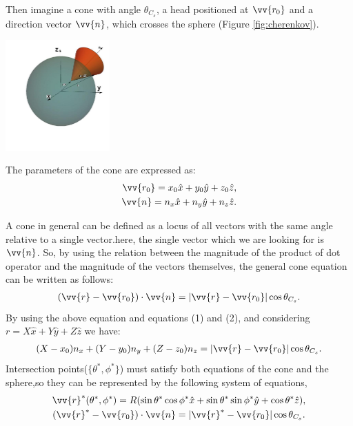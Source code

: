 \documentclass{article}
\begin{document}
\begin{multicols}{2}
Then imagine a cone with angle $\theta_{C_s}$, a head positioned at $\vv{r_0}$ and a direction vector $\vv{n}$, which crosses the sphere (Figure \ref{fig:cherenkov}).

\hspace{+2cm}\includegraphics[width=0.3\textwidth]{cherenkov.jpg}
\label{fig:cherenkov}

The parameters of the cone are expressed as:
\begin{align}
\vv{r_0} = x_0 \hat{x} + y_0 \hat{y} + z_0 \hat{z},
\\
\vv{n} = n_x \hat{x} + n_y \hat{y} + n_z \hat{z}. 
\end{align}

A cone in general can be defined as a locus of  all vectors with the same angle relative to a single vector.here, the single vector which we are looking for is $\vv{n}$. So, by using the relation between the magnitude of the product of dot operator and the magnitude of the vectors themselves, the general cone equation can be written as follows:
\begin{align}
(\vv{r}-\vv{r_0}) \cdot \vv{n} = |\vv{r}-\vv{r_0}| \cos{\theta_{C_s}}.
\end{align}
By using the above equation and equations (1) and (2), and considering $r=X\hat{x}+Y\hat{y}+Z\hat{z}$ we have:
\begin{align}
(X-x_0)n_x+(Y-y_0)n_y+(Z-z_0)n_z = |\vv{r}-\vv{r_0}| \cos{\theta_{C_s}}.
\label{Eq:equation1} %
\end{align}
Intersection points($\{\theta^{*},\phi^{*}\}$) must satisfy both equations of the cone and the sphere,so they can be represented by the following system of equations,
\begin{gather*}
   \vv{r}^{*}(\theta^{*},\phi^{*}) = R(\sin{\theta^{*}} \cos{\phi^{*}}\hat{x} + \sin{\theta^{*}} \sin{\phi^{*}} \hat{y} + \cos{\theta^{*}} \hat{z}) ,
   \\
   (\vv{r}^{*}-\vv{r_0}) \cdot \vv{n} = |\vv{r}^{*}-\vv{r_0}| \cos{\theta_{C_s}}.
   \label{Eq:equation1} %
\end{gather*}


\end{multicols}
\end{document}
